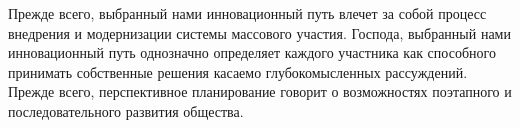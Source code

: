 \begin{otherlanguage}{russian}
Прежде всего, выбранный нами инновационный путь влечет за собой процесс внедрения и модернизации системы массового участия. Господа, выбранный нами инновационный путь однозначно определяет каждого участника как способного принимать собственные решения касаемо глубокомысленных рассуждений. Прежде всего, перспективное планирование говорит о возможностях поэтапного и последовательного развития общества.
\end{otherlanguage}
\newpage